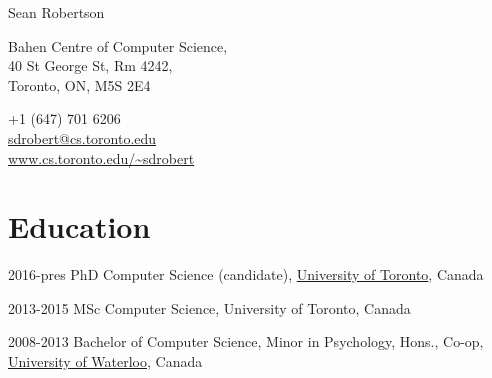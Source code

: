 \documentclass{article}
\begin{document}
\thispagestyle{empty}

\begin{center}
  \huge{Sean Robertson}
\end{center}
\vspace{\baselineskip}

\begin{center}
  \begin{minipage}{0.5\textwidth}
  \begin{flushleft}
    Bahen Centre of Computer Science, \\
    40 St George St, Rm 4242, \\
    Toronto, ON, M5S 2E4
  \end{flushleft}
  \end{minipage}
  \hfill
  \begin{minipage}{0.4\textwidth}
  \begin{flushright}
    +1 (647) 701 6206 \\
    \href{mailto:sdrobert@cs.toronto.edu}{sdrobert@cs.toronto.edu} \\
    \url{www.cs.toronto.edu/~sdrobert}
  \end{flushright}
  \end{minipage}
\end{center}

\section{Education}
\begin{CV}
  \item[2016-pres] PhD Computer Science (candidate),
    \href{https://www.utoronto.ca/}{University of Toronto}, Canada

  \item[2013-2015] MSc Computer Science, University of Toronto, Canada

  \item[2008-2013] Bachelor of Computer Science, Minor in Psychology, Hons.,
    Co-op, \href{https://uwaterloo.ca/}{University of Waterloo}, Canada
\end{CV}
\end{document}

